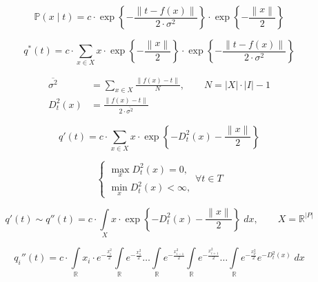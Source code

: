 \begin{equation*}
  \mathbb{P}\left( x \mid t \right)
  = c
    \cdot \exp{\left\{ - \frac{\left\| t - f\left( x \right) \right\|}
                              {2 \cdot \sigma^2} \right\}}
    \cdot \exp{\left\{ - \frac{\left\| x \right\|}{2} \right\}}
\end{equation*}

\begin{equation*}
  q^* \left( t \right)
  = c
    \cdot \sum_{x \in X}
      x
      \cdot \exp{\left\{ - \frac{\left\| x \right\|}{2} \right\}}
      \cdot \exp{\left\{ - \frac{\left\| t - f\left( x \right) \right\|}
                                {2 \cdot \sigma^2} \right\}}
\end{equation*}

\begin{equation*}
  \begin{split}
    \overline{\sigma^2}
      &= \sum_{x \in X} \frac{\left\| f\left( x \right) - t \right\|}{N}, \qquad
      N = \left| X \right| \cdot \left| I \right| - 1 \\
    D_t^2\left( x \right)
      &= \frac{\left\| f\left( x \right) - t \right\|}
              {2 \cdot \overline{\sigma^2}}
  \end{split}
\end{equation*}

\begin{equation*}
  q'\left( t \right)
  =
  c \cdot
  \sum_{x \in X}
  x
  \cdot \exp{\left\{
    - D_t^2\left( x \right)
    - \frac{\left\| x \right\|}{2} \right\}}
\end{equation*}

\begin{equation*}
  \begin{cases}
    \max\limits_{x} D_t^2\left( x \right) = 0, \\
    \min\limits_{x} D_t^2\left( x \right) < \infty,
  \end{cases} \forall t \in T
\end{equation*}

\begin{equation*}
  q'\left( t \right)
  \sim
  q''\left( t \right)
  =
  c \cdot
  \int\limits_{X}
    x
    \cdot \exp{\left\{
      - D_t^2\left( x \right)
      - \frac{\left\| x \right\|}{2} \right\}} \;dx, \qquad
  X = \mathbb{R}^{\left| P \right|}
\end{equation*}

\begin{equation*}
  q_i''\left( t \right)
  =
  c \cdot
  \int\limits_{\mathbb{R}} x_i \cdot e^{- \frac{x_i^2}{2}}
  \int\limits_{\mathbb{R}} e^{- \frac{x_1^2}{2}}
  \dots
  \int\limits_{\mathbb{R}} e^{- \frac{x_{i-1}^2}{2}}
  \int\limits_{\mathbb{R}} e^{- \frac{x_{i+1}^2}{2}}
  \dots
  \int\limits_{\mathbb{R}} e^{- \frac{x_p^2}{2}} e^{-D_t^2\left( x \right)}
  \;dx
\end{equation*}

